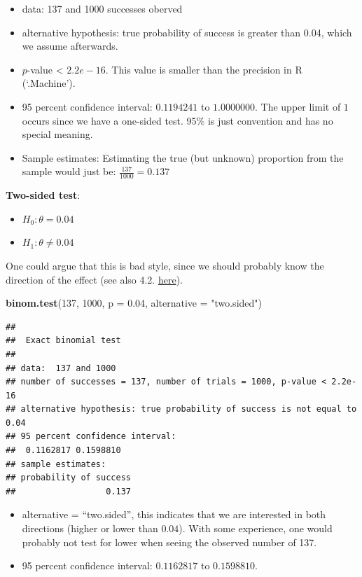 \documentclass[
]{book}
\newenvironment{Shaded}{\begin{snugshade}}{\end{snugshade}}
\newcommand{\AttributeTok}[1]{\textcolor[rgb]{0.13,0.29,0.53}{#1}}
\newcommand{\DecValTok}[1]{\textcolor[rgb]{0.00,0.00,0.81}{#1}}
\newcommand{\FloatTok}[1]{\textcolor[rgb]{0.00,0.00,0.81}{#1}}
\newcommand{\FunctionTok}[1]{\textcolor[rgb]{0.13,0.29,0.53}{\textbf{#1}}}
\newcommand{\NormalTok}[1]{#1}
\newcommand{\StringTok}[1]{\textcolor[rgb]{0.31,0.60,0.02}{#1}}
\providecommand{\tightlist}{%
  \setlength{\itemsep}{0pt}\setlength{\parskip}{0pt}}
\begin{document}
\begin{itemize}
\tightlist
\item
  data: 137 and 1000 successes oberved
\item
  alternative hypothesis: true probability of success is greater than 0.04, which we assume afterwards.
\item
  \(p\)-value \textless{} \(2.2e-16\). This value is smaller than the precision in R (`.Machine').
\item
  95 percent confidence interval: \(0.1194241\) to \(1.0000000\).
  The upper limit of \(1\) occurs since we have a one-sided test.
  95\% is just convention and has no special meaning.
\item
  Sample estimates: Estimating the true (but unknown) proportion from the sample would just be:
  \(\frac{137}{1000} = 0.137\)
\end{itemize}

\textbf{Two-sided test}:

\begin{itemize}
\tightlist
\item
  \(H_0: \theta = 0.04\)
\item
  \(H_1: \theta \ne 0.04\)
\end{itemize}

One could argue that this is bad style, since we should probably know the direction of the effect
(see also 4.2. \href{https://errorstatistics.com/wp-content/uploads/2015/07/cox-1977-with-discussion-and-reply-nc.pdf}{here}).

\begin{Shaded}
\begin{Highlighting}[]
\FunctionTok{binom.test}\NormalTok{(}\DecValTok{137}\NormalTok{, }\DecValTok{1000}\NormalTok{, }\AttributeTok{p =} \FloatTok{0.04}\NormalTok{, }\AttributeTok{alternative =} \StringTok{"two.sided"}\NormalTok{)}
\end{Highlighting}
\end{Shaded}

\begin{verbatim}
## 
##  Exact binomial test
## 
## data:  137 and 1000
## number of successes = 137, number of trials = 1000, p-value < 2.2e-16
## alternative hypothesis: true probability of success is not equal to 0.04
## 95 percent confidence interval:
##  0.1162817 0.1598810
## sample estimates:
## probability of success 
##                  0.137
\end{verbatim}

\begin{itemize}
\tightlist
\item
  alternative = ``two.sided'', this indicates that we are interested in both directions (higher or lower than \(0.04\)).
  With some experience, one would probably not test for lower when seeing the observed number of 137.
\item
  95 percent confidence interval: \(0.1162817\) to \(0.1598810\).
\end{itemize}
\end{document}
